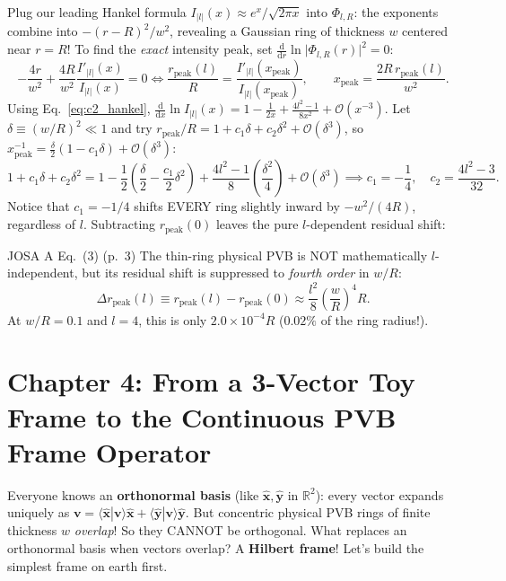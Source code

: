 \documentclass[10pt,letterpaper]{article}
\newcommand{\braket}[2]{\langle #1 | #2 \rangle}
\newcommand{\abs}[1]{\lvert #1 \rvert}
\newcommand{\dd}{\mathrm{d}}
\numberwithin{equation}{section}
\begin{document}
Plug our leading Hankel formula $I_{\abs{l}}(x) \approx e^x/\sqrt{2\pi x}$ into $\Phi_{l,R}$: the exponents combine into $-(r-R)^2/w^2$, revealing a Gaussian ring of thickness $w$ centered near $r = R$! To find the \emph{exact} intensity peak, set $\frac{\dd}{\dd r}\ln\abs{\Phi_{l,R}(r)}^2 = 0$:
\begin{equation}
  -\frac{4r}{w^2} + \frac{4R}{w^2}\frac{I'_{\abs{l}}(x)}{I_{\abs{l}}(x)} = 0 \iff \frac{r_{\mathrm{peak}}(l)}{R} = \frac{I'_{\abs{l}}(x_{\mathrm{peak}})}{I_{\abs{l}}(x_{\mathrm{peak}})}, \qquad x_{\mathrm{peak}} = \frac{2R\,r_{\mathrm{peak}}(l)}{w^2}.
\end{equation}
Using Eq.~\eqref{eq:c2_hankel}, $\frac{\dd}{\dd x}\ln I_{\abs{l}}(x) = 1 - \frac{1}{2x} + \frac{4l^2-1}{8x^2} + \mathcal{O}(x^{-3})$. Let $\delta \equiv (w/R)^2 \ll 1$ and try $r_{\mathrm{peak}}/R = 1 + c_1\delta + c_2\delta^2 + \mathcal{O}(\delta^3)$, so $x_{\mathrm{peak}}^{-1} = \frac{\delta}{2}(1 - c_1\delta) + \mathcal{O}(\delta^3)$:
\begin{equation}
  1 + c_1\delta + c_2\delta^2 = 1 - \frac{1}{2}\left(\frac{\delta}{2} - \frac{c_1}{2}\delta^2\right) + \frac{4l^2-1}{8}\left(\frac{\delta^2}{4}\right) + \mathcal{O}(\delta^3)
  \implies c_1 = -\frac{1}{4}, \quad c_2 = \frac{4l^2 - 3}{32}.
\end{equation}
Notice that $c_1 = -1/4$ shifts EVERY ring slightly inward by $-w^2/(4R)$, regardless of $l$. Subtracting $r_{\mathrm{peak}}(0)$ leaves the pure $l$-dependent residual shift:

\begin{paperhit}{JOSA A Eq.~(3) (p.~3)}
The thin-ring physical PVB is NOT mathematically $l$-independent, but its residual shift is suppressed to \emph{fourth order} in $w/R$:
\[
  \Delta r_{\mathrm{peak}}(l) \equiv r_{\mathrm{peak}}(l) - r_{\mathrm{peak}}(0) \approx \frac{l^2}{8}\left(\frac{w}{R}\right)^4 R.
\]
At $w/R = 0.1$ and $l = 4$, this is only $2.0\times 10^{-4} R$ ($0.02\%$ of the ring radius!).
\end{paperhit}

\section{Chapter 4: From a 3-Vector Toy Frame to the Continuous PVB Frame Operator}
\label{sec:c4}

\begin{whystep}
Everyone knows an \textbf{orthonormal basis} (like $\hat{\mathbf{x}}, \hat{\mathbf{y}}$ in $\mathbb{R}^2$): every vector expands uniquely as $\mathbf{v} = \braket{\hat{\mathbf{x}}}{\mathbf{v}}\hat{\mathbf{x}} + \braket{\hat{\mathbf{y}}}{\mathbf{v}}\hat{\mathbf{y}}$. But concentric physical PVB rings of finite thickness $w$ \emph{overlap}! So they CANNOT be orthogonal. What replaces an orthonormal basis when vectors overlap? A \textbf{Hilbert frame}! Let's build the simplest frame on earth first.
\end{whystep}
\end{document}

